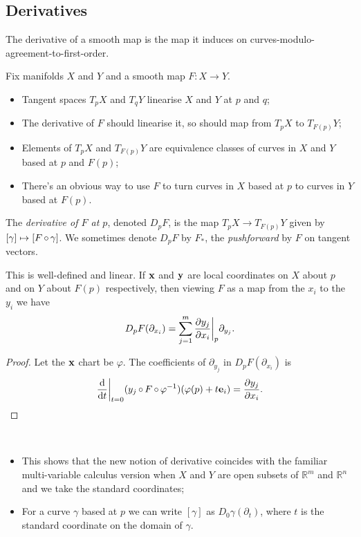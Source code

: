 \documentclass[a4paper,11pt]{article}
\begin{document}
	\subsection{Derivatives} 

	The derivative of a smooth map is the map it induces on curves-modulo-agreement-to-first-order.

	Fix manifolds $X$ and $Y$ and a smooth map $F: X \to Y$.

	\begin{itemize}
		\item Tangent spaces $T_p X$ and $T_q Y$ linearise $X$ and $Y$ at $p$ and $q$;
		\item The derivative of $F$ should linearise it, so should map from $T_p X$ to $T_{F(p)}Y$;
		\item Elements of $T_p X$ and $T_{F(p)}Y$ are equivalence classes of curves in $X$ and $Y$ based at $p$ and $F(p)$;
		\item There's an obvious way to use $F$ to turn curves in $X$ based at $p$ to curves in $Y$ based at $F(p)$.
	\end{itemize}

	\begin{defi}
		The \emph{derivative of $F$ at $p$}, denoted $D_p F$, is the map $T_p X \to T_{F(p)}Y$ given by $[\gamma]\mapsto [F\operatorname{\circ} \gamma]$. We sometimes denote $D_p F$ by $F_*$, the \emph{pushforward} by $F$ on tangent vectors. 
	\end{defi}


	\begin{lem}
		This is well-defined and linear. If $\vb x$ and $\vb y$ are local coordinates on $X$ about $p$ and on $Y$ about $F(p)$ respectively, then viewing $F$ as a map from the $x_i$ to the $y_i$ we have
		\[
			D_p F(\partial_{x_i}) = \sum_{j=1}^m \pdv{y_j}{x_i}\bigg|_{p} \partial_{y_j}.
		\]
	\end{lem}
	\begin{proof}
		Let the $\vb x$ chart be $\varphi$. The coefficients of $\partial_{y_j}$ in $D_p F(\partial_{x_i})$ is
		\[
			\dv{t}\bigg|_{t=0} (y_j \operatorname{\circ} F \operatorname{\circ} \varphi^{-1}) (\varphi(p) + t \vb e_i) = \pdv{y_j}{x_i}.
		\]
	\end{proof}

	\begin{rmk}
		\
		\begin{itemize}
			\item This shows that the new notion of derivative coincides with the familiar multi-variable calculus version when $X$ and $Y$ are open subsets of $\mathbb{R}^m$ and $\mathbb{R}^n$ and we take the standard coordinates;
			\item For a curve $\gamma$ based at $p$ we can write $[\gamma]$ as $D_0 \gamma (\partial_t)$, where $t$ is the standard coordinate on the domain of $\gamma$.
		\end{itemize}
	\end{rmk}
\end{document}
